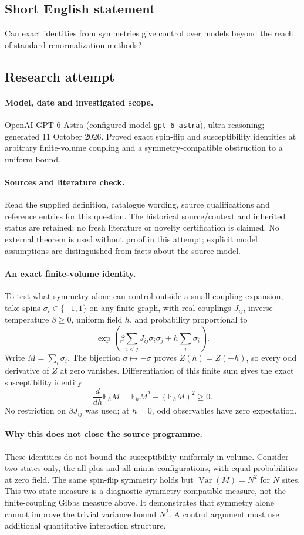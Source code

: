 \documentclass[11pt]{article}
\begin{document}
\subsection{Short English statement}
Can exact identities from symmetries give control over models beyond the reach of standard renormalization methods?
\subsection{Research attempt}
\paragraph{Model, date and investigated scope.}
OpenAI GPT-6 Astra (configured model \texttt{gpt-6-astra}), ultra reasoning; generated 11 October 2026. Proved exact spin-flip and susceptibility identities at arbitrary finite-volume coupling and a symmetry-compatible obstruction to a uniform bound.

\paragraph{Sources and literature check.}
Read the supplied definition, catalogue wording, source qualifications and reference entries for this question. The historical source/context and inherited status are retained; no fresh literature or novelty certification is claimed. No external theorem is used without proof in this attempt; explicit model assumptions are distinguished from facts about the source model.

\paragraph{An exact finite-volume identity.} To test what symmetry alone can control outside a small-coupling expansion, take spins \(\sigma_i\in\{-1,1\}\) on any finite graph, with real couplings \(J_{ij}\), inverse temperature \(\beta\ge0\), uniform field \(h\), and probability proportional to
\[
 \exp\left(\beta\sum_{i<j}J_{ij}\sigma_i\sigma_j+h\sum_i\sigma_i\right).
\]
Write \(M=\sum_i\sigma_i\). The bijection \(\sigma\mapsto-\sigma\) proves \(Z(h)=Z(-h)\), so every odd derivative of \(Z\) at zero vanishes. Differentiation of this finite sum gives the exact susceptibility identity
\[
 \frac{d}{dh}\mathbb E_h M=\mathbb E_h M^2-(\mathbb E_h M)^2\ge0.
\]
No restriction on \(\beta J_{ij}\) was used; at \(h=0\), odd observables have zero expectation.
\paragraph{Why this does not close the source programme.} These identities do not bound the susceptibility uniformly in volume. Consider two states only, the all-plus and all-minus configurations, with equal probabilities at zero field. The same spin-flip symmetry holds but \(\operatorname{Var}(M)=N^2\) for \(N\) sites. This two-state measure is a diagnostic symmetry-compatible measure, not the finite-coupling Gibbs measure above. It demonstrates that symmetry alone cannot improve the trivial variance bound \(N^2\). A control argument must use additional quantitative interaction structure.
\end{document}
